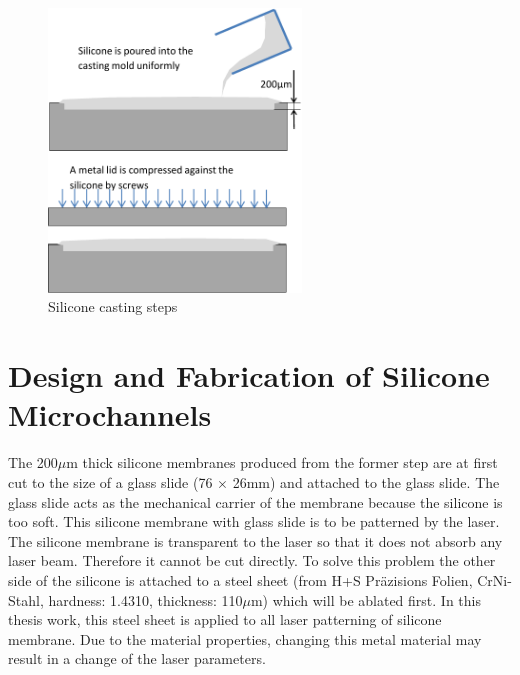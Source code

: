 \begin{figure}[!t]%
\centering
\includegraphics[width=0.6\textwidth]{figures/designandfabrication/figure3_3}%
\caption{Silicone casting steps}%
\label{figure3_3}%
\end{figure}

\section{Design and Fabrication of Silicone Microchannels}
\label{3_4}
The 200$\mu$m thick silicone membranes produced from the former step are at first cut to the size of a glass slide (76 $\times$ 26mm) and attached to the glass slide. The glass slide acts as the mechanical carrier of the membrane because the silicone is too soft. This silicone membrane with glass slide is to be patterned by the laser. \\

The silicone membrane is transparent to the laser so that it does not absorb any laser beam. Therefore it cannot be cut directly. To solve this problem the other side of the silicone is attached to a steel sheet (from H+S Pr\"azisions Folien, CrNi-Stahl, hardness: 1.4310, thickness: 110$\mu$m) which will be ablated first. In this thesis work, this steel sheet is applied to all laser patterning of silicone membrane. Due to the material properties, changing this metal material may result in a change of the laser parameters. \\


